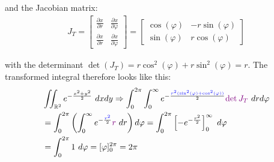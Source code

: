 and the Jacobian matrix:
\begin{align*}
	J_T =
	\begin{bmatrix}
		\frac{\partial x}{\partial r} & \frac{\partial x}{\partial \varphi} \\
		\frac{\partial x}{\partial r} & \frac{\partial x}{\partial \varphi}
	\end{bmatrix}
	=
	\begin{bmatrix}
		\cos(\varphi) & -r\sin(\varphi) \\
		\sin(\varphi) & r\cos(\varphi)
	\end{bmatrix}
\end{align*}

with the determinant $\det(J_T) = r\cos^2(\varphi) + r\sin^2(\varphi) = r$.
The transformed integral therefore looks like this:
\begin{align*}
	& \iint_{\mathbb{R}^2}e^{-\frac{x^2+y^2}{2}}\ dxdy \Rightarrow
	\int_0^{2\pi}\int_0^\infty e^{-\frac{\color{blue}r^2(\sin^2(\varphi)+\cos^2(\varphi))}{2}}{\color{purple}\det J_T}\ drd\varphi \\
	& = \int_0^{2\pi}\left(\int_0^\infty e^{-\frac{\color{blue}r^2}{2}}{\color{purple}r}\ dr\right)d\varphi 
	= \int_0^{2\pi} \left[ -e^{-\frac{r^2}{2}} \right]^\infty_0\ d\varphi \\
	& = \int_0^{2\pi} 1\ d\varphi = [\varphi]^{2\pi}_0 = 2\pi
\end{align*}
